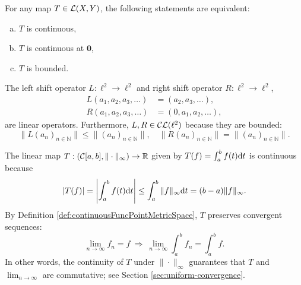 \begin{thm}
  \label{thm:contLinearOpEquBoundedOp}
  For any map $T\in {\cal L}(X,Y)$, the following statements are equivalent:
  \begin{enumerate}[(a)]\itemsep0em
  \item $T$ is continuous,
  \item $T$ is continuous at $\mathbf{0}$,
  \item $T$ is bounded. 
  \end{enumerate}
\end{thm}

\begin{exm}
  \label{exm:leftAndRightShiftOnEll2}
  The left shift operator $L: \ell^2\rightarrow \ell^2$
  and right shift operator $R: \ell^2\rightarrow \ell^2$,
  \begin{align}
    \label{eq:leftShift}
    L(a_1, a_2, a_3, \ldots) &= (a_2, a_3, \ldots),
    \\
    \label{eq:rightShift}
    R(a_1, a_2, a_3, \ldots) &= (0, a_1, a_2,  \ldots),
  \end{align}
  are linear operators.
  Furthermore, $L, R\in {\cal CL}(\ell^2)$ because
  they are bounded:
  \begin{displaymath}
    \|L(a_n)_{n\in \mathbb{N}}\| \le \|(a_n)_{n\in \mathbb{N}}\|,
    \quad
    \|R(a_n)_{n\in \mathbb{N}}\| = \|(a_n)_{n\in \mathbb{N}}\|.
  \end{displaymath}
\end{exm}

\begin{exm}
  \label{exm:integralAsCLmap}
  The linear map $T: ({\cal C}[a,b],\|\cdot\|_{\infty})\rightarrow
  \mathbb{R}$
  given by $T(f) = \int_a^b f(t) \mathrm{d} t$ is continuous
  because
  \begin{displaymath}
    |T(f)| = \left|\int_a^b f(t) \mathrm{d} t\right|
    \le \int_a^b\|f\|_{\infty}\mathrm{d} t
    = (b-a) \|f\|_{\infty}.
  \end{displaymath}
  By Definition \ref{def:continuousFuncPointMetricSpace}, 
  $T$ preserves convergent sequences:
  \begin{displaymath}
    \lim_{n\rightarrow \infty} f_n = f
    \ \Rightarrow\
    \lim_{n\rightarrow \infty} \int_a^b f_n = \int_a^b f.
  \end{displaymath}
  In other words, the continuity of $T$
  under $\|\cdot\|_{\infty}$ guarantees
  that $T$ and $\lim_{n\rightarrow \infty}$ are commutative;
  see Section \ref{sec:uniform-convergence}.
\end{exm}

